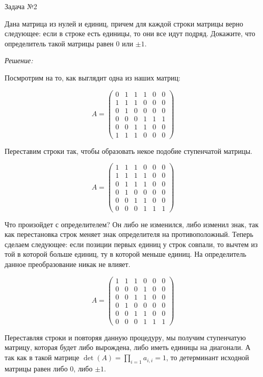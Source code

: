 \documentclass[10pt]{article}
\begin{document}
\hspace{2mm}

Задача №2

Дана матрица из нулей и единиц, причем для каждой строки матрицы верно следующее: если в строке есть единицы, то они все идут подряд. Докажите, что определитель такой матрицы равен 0 или $\pm 1$.

\textit{Решение:}

Посмротрим на то, как выглядит одна из наших матриц:

\[
A = \begin{pmatrix}
0 & 1 & 1 & 1 & 0 & 0 \\
1 & 1 & 1 & 0 & 0 & 0 \\
0 & 1 & 0 & 0 & 0 & 0 \\
0 & 0 & 0 & 1 & 1 & 1 \\
0 & 0 & 1 & 1 & 0 & 0 \\
1 & 1 & 1 & 0 & 0 & 0
\end{pmatrix}
\]

Переставим строки так, чтобы образовать некое подобие ступенчатой матрицы.

\[
A = \begin{pmatrix}
1 & 1 & 1 & 0 & 0 & 0 \\
1 & 1 & 1 & 1 & 0 & 0 \\
0 & 1 & 1 & 1 & 0 & 0 \\
0 & 1 & 0 & 0 & 0 & 0 \\
0 & 0 & 1 & 1 & 0 & 0 \\
0 & 0 & 0 & 1 & 1 & 1
\end{pmatrix}
\]

Что произойдет с определителем? Он либо не изменился, либо изменил знак, так как перестановка строк меняет знак определителя на противоположный. Теперь сделаем следующее: если позиции первых единиц у строк совпали, то вычтем из той в которой больше единиц, ту в которой меньше единиц. На определитель данное преобразование никак не влияет.

\[
A = \begin{pmatrix}
1 & 1 & 1 & 0 & 0 & 0 \\
0 & 0 & 0 & 1 & 0 & 0 \\
0 & 0 & 1 & 1 & 0 & 0 \\
0 & 1 & 0 & 0 & 0 & 0 \\
0 & 0 & 1 & 1 & 0 & 0 \\
0 & 0 & 0 & 1 & 1 & 1
\end{pmatrix}
\]

Переставляя строки и повторяя данную процедуру, мы получим ступенчатую матрицу, которая будет либо вырождена, либо иметь единицы на диагонали. А так как в такой матрице $\det(A) = \prod_{i=1} a_{i,i} = 1$, то детерминант исходной матрицы равен либо 0, либо $\pm 1$.
\end{document}
